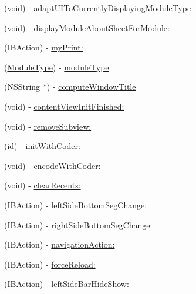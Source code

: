 \begin{DoxyCompactItemize}
(void) -\/ \hyperlink{interface_window_host_controller_af809211014fa5b4880af5a201cc81b36}{adapt\-U\-I\-To\-Currently\-Displaying\-Module\-Type}
\item 
(void) -\/ \hyperlink{interface_window_host_controller_a254da93c19ddea8db470cf653b8b5354}{display\-Module\-About\-Sheet\-For\-Module\-:}
\item 
(I\-B\-Action) -\/ \hyperlink{interface_window_host_controller_a24edf89dac463cf7e136edbc5b69e5fb}{my\-Print\-:}
\item 
(\hyperlink{_sword_module_8h_a224128d35337e2b42cebf846d4d0c6f1}{Module\-Type}) -\/ \hyperlink{interface_window_host_controller_a2e69825435ec5d0c8cd8c49f5655ab6c}{module\-Type}
\item 
(N\-S\-String $\ast$) -\/ \hyperlink{interface_window_host_controller_aa0e4f7fb871f11d6f4783c36df16c0e1}{compute\-Window\-Title}
\item 
(void) -\/ \hyperlink{interface_window_host_controller_a14ea82a054bc45c1a1c62bb7f6985da2}{content\-View\-Init\-Finished\-:}
\item 
(void) -\/ \hyperlink{interface_window_host_controller_afc97bbb7e9b0d2f6b9fd995ada16f4a1}{remove\-Subview\-:}
\item 
(id) -\/ \hyperlink{interface_window_host_controller_a6cf57c30ef62d8a0b74eafd74d0f8b39}{init\-With\-Coder\-:}
\item 
(void) -\/ \hyperlink{interface_window_host_controller_a958c5e82e2f22a1a132161999b5d1704}{encode\-With\-Coder\-:}
\item 
(void) -\/ \hyperlink{interface_window_host_controller_a8344565b9772af4717a1966dd674cc13}{clear\-Recents\-:}
\item 
(I\-B\-Action) -\/ \hyperlink{interface_window_host_controller_a8056b79e130201f665a4c33125546a72}{left\-Side\-Bottom\-Seg\-Change\-:}
\item 
(I\-B\-Action) -\/ \hyperlink{interface_window_host_controller_ac9e6f47af3d2473b69f862a91025a786}{right\-Side\-Bottom\-Seg\-Change\-:}
\item 
(I\-B\-Action) -\/ \hyperlink{interface_window_host_controller_ae7cc9eb1976537581413e803f560dd66}{navigation\-Action\-:}
\item 
(I\-B\-Action) -\/ \hyperlink{interface_window_host_controller_a94a15b622fea5bac0e9ad90c90d07401}{force\-Reload\-:}
\item 
(I\-B\-Action) -\/ \hyperlink{interface_window_host_controller_a4f1a59ffe927b9746c01e98799522036}{left\-Side\-Bar\-Hide\-Show\-:}
\item 

\end{DoxyCompactItemize}
